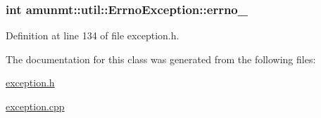 \subsubsection[{\texorpdfstring{errno\+\_\+}{errno_}}]{\setlength{\rightskip}{0pt plus 5cm}int amunmt\+::util\+::\+Errno\+Exception\+::errno\+\_\+\hspace{0.3cm}{\ttfamily [private]}}\hypertarget{classamunmt_1_1util_1_1ErrnoException_a865d5044fe0783940c1121c46ea4762b}{}\label{classamunmt_1_1util_1_1ErrnoException_a865d5044fe0783940c1121c46ea4762b}


Definition at line 134 of file exception.\+h.



The documentation for this class was generated from the following files\+:\begin{DoxyCompactItemize}
\item 
\hyperlink{exception_8h}{exception.\+h}\item 
\hyperlink{exception_8cpp}{exception.\+cpp}\end{DoxyCompactItemize}
